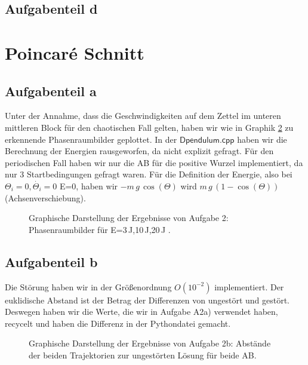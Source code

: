 \subsection*{Aufgabenteil d} %

\section*{Poincar\'{e} Schnitt}
\subsection*{Aufgabenteil a}
Unter der Annahme, dass die Geschwindigkeiten auf dem Zettel im unteren mittleren Block für den chaotischen Fall gelten, haben wir wie in Graphik \ref{fig:OsziC1} zu erkennende Phasenraumbilder geplottet. In der $\textsf{Dpendulum.cpp}$ haben wir die Berechnung der Energien rausgeworfen, da nicht explizit gefragt. Für den periodischen Fall haben wir nur die AB für die positive Wurzel implementiert, da nur 3 Startbedingungen gefragt waren. Für die Definition der Energie, also bei $\Theta_i = 0, \dot{\Theta_i} = 0$ E=0, haben wir $-m\,g\,\cos(\Theta)$ wird $m\,g\,(1-\cos(\Theta))$ (Achsenverschiebung).

\begin{landscape}
	\begin{figure}
		\caption{Graphische Darstellung der Ergebnisse von Aufgabe 2: Phasenraumbilder für E=3$\,$J,10$\,$J,20$\,$J .}
		\label{fig:OsziC1}
	\end{figure}
\end{landscape} 
\subsection*{Aufgabenteil b}
Die Störung haben wir in der Größenordnung $O(10^{-2})$ implementiert. Der euklidische Abstand ist der Betrag der Differenzen von ungestört und gestört. Deswegen haben wir die Werte, die wir in Aufgabe A2a) verwendet haben, recycelt und haben die Differenz in der Pythondatei gemacht.
\begin{landscape}
	\begin{figure}
		\caption{Graphische Darstellung der Ergebnisse von Aufgabe 2b: Abstände der beiden Trajektorien zur ungestörten Lösung für beide AB.}
		\label{fig:OsziC1}
	\end{figure}
\end{landscape} 
 
